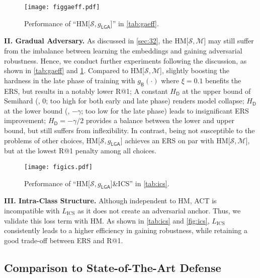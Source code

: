 \documentclass[10pt,twocolumn,letterpaper]{article}
\begin{document}
\begin{figure}[t]
	\vspace{-1em}
	\texttt{[image: figgaeff.pdf]}
	\vspace{-1.9em}
	\caption{Performance of ``HM[$\mathcal{S},g_\mathsf{LGA}$]'' in
	\cref{tab:gaeff}.}
	\label{fig:gaeff}
\end{figure}

\noindent\textbf{II. Gradual Adversary.}
%
As discussed in \cref{sec:32}, the HM[$\mathcal{S},\mathcal{M}$] may still suffer
from the imbalance between learning the embeddings and gaining adversarial
robustness.
%
Hence, we conduct further experiments %
following the discussion, as shown in \cref{tab:gaeff} and \cref{fig:gaeff}.
%
Compared to HM[$\mathcal{S},\mathcal{M}$], slightly boosting the hardness in
the late phase of training with $g_\mathsf{B}(\cdot)$ where $\xi{=}0.1$
benefits the ERS, but results in a notably lower R@1;
%
A constant $H_\mathsf{D}$ at the upper bound of Semihard (\ie, $0$; too high
for both early and late phase) renders model collapse;
%
$H_\mathsf{D}$ at the lower bound (\ie, $-\gamma$; too low for the late phase)
leads to insignificant ERS improvement;
%
$H_\mathsf{D}{=}-\gamma/2$ provides a balance between the lower and upper
bound, but still suffers from inflexibility.
%
In contrast, being not susceptible to the problems of other choices,
HM[$\mathcal{S},g_\mathsf{LGA}$] achieves an ERS on par with
HM[$\mathcal{S},\mathcal{M}$], but at the lowest R@1 penalty among all choices.

\begin{figure}[t]
	\vspace{-1em}
	\texttt{[image: figics.pdf]}
	\vspace{-1.9em}
	\caption{Performance of ``HM[$\mathcal{S},g_\mathsf{LGA}$]\&ICS'' in \cref{tab:ics}.}
\end{figure}


\noindent\textbf{III. Intra-Class Structure.}
%
Although independent to HM, ACT is incompatible with $L_\text{ICS}$ as it does
not create an adversarial anchor.
%
Thus, we validate this loss term with HM.
%
As shown in \cref{tab:ics} and \cref{fig:ics}, $L_\text{ICS}$ consistently
leads to a higher efficiency in gaining robustness, while retaining a
good trade-off between ERS and R@1.



\subsection{Comparison to State-of-The-Art Defense}
\label{sec:43}
\end{document}

